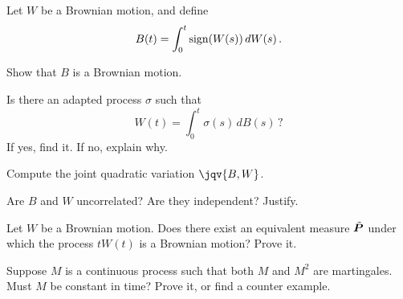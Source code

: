 \begin{problem}
  Let $W$ be a Brownian motion, and define
  \begin{equation*}
    B(t) = \int_0^t \sign(W(s)) \, dW(s)\,.
  \end{equation*}
  \begin{parts}
    \item
      Show that $B$ is a Brownian motion.

    \item
      Is there an adapted process $\sigma$ such that
      \begin{equation*}
	W(t) = \int_0^t \sigma(s) \, dB(s)\,?
      \end{equation*}
      If yes, find it.
      If no, explain why.

    \item
      Compute the joint quadratic variation $\jqv{B, W}$.

    \item
      Are $B$ and $W$ uncorrelated?
      Are they independent?
      Justify.
  \end{parts}
\end{problem}

\begin{problem}
  Let $W$ be a Brownian motion.
  Does there exist an equivalent measure $\tilde\P$ under which the process $t W(t)$ is a Brownian motion?
  Prove it.
\end{problem}

\begin{problem}
  Suppose $M$ is a continuous process such that both $M$ and $M^2$ are martingales.
  Must $M$ be constant in time?
  Prove it, or find a counter example.
\end{problem}


\iffalse
\begin{problem}
  Kolmogorov forward equation.
\end{problem}
\fi

